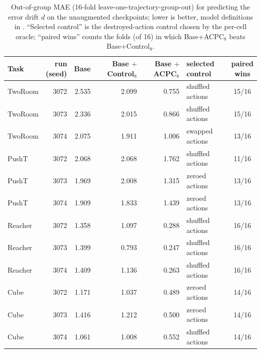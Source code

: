 \begin{table}[t]
\centering
\caption{Out-of-group MAE (16-fold leave-one-trajectory-group-out) for predicting the error drift $d$ on the unaugmented checkpoints; lower is better, model definitions in . ``Selected control'' is the destroyed-action control chosen by the per-cell oracle; ``paired wins'' counts the folds (of 16) in which Base+ACPC$_8$ beats Base+Control$_8$.}
\label{tab:target-aligned-acpc-absolute}
\footnotesize
\setlength{\tabcolsep}{3.2pt}
\begin{tabular}{lrrrrlc}
\toprule
Task & \shortstack{run\\(seed)} & Base & \shortstack{Base\\$+$Control$_8$} & \shortstack{Base\\$+$ACPC$_8$} & \shortstack{selected\\control} & \shortstack{paired\\wins} \\
\midrule
TwoRoom & 3072 & 2.535 & 2.099 & 0.755 & shuffled actions & 15/16 \\
TwoRoom & 3073 & 2.336 & 2.015 & 0.866 & shuffled actions & 15/16 \\
TwoRoom & 3074 & 2.075 & 1.911 & 1.006 & swapped actions & 13/16 \\
\addlinespace[1pt]
PushT & 3072 & 2.068 & 2.068 & 1.762 & shuffled actions & 11/16 \\
PushT & 3073 & 1.969 & 2.008 & 1.315 & zeroed actions & 13/16 \\
PushT & 3074 & 1.909 & 1.833 & 1.439 & zeroed actions & 13/16 \\
\addlinespace[1pt]
Reacher & 3072 & 1.358 & 1.097 & 0.288 & shuffled actions & 16/16 \\
Reacher & 3073 & 1.399 & 0.793 & 0.247 & shuffled actions & 16/16 \\
Reacher & 3074 & 1.409 & 1.136 & 0.263 & shuffled actions & 16/16 \\
\addlinespace[1pt]
Cube & 3072 & 1.171 & 1.037 & 0.489 & zeroed actions & 14/16 \\
Cube & 3073 & 1.416 & 1.212 & 0.500 & zeroed actions & 14/16 \\
Cube & 3074 & 1.061 & 1.008 & 0.552 & shuffled actions & 14/16 \\
\bottomrule
\end{tabular}
\end{table}
